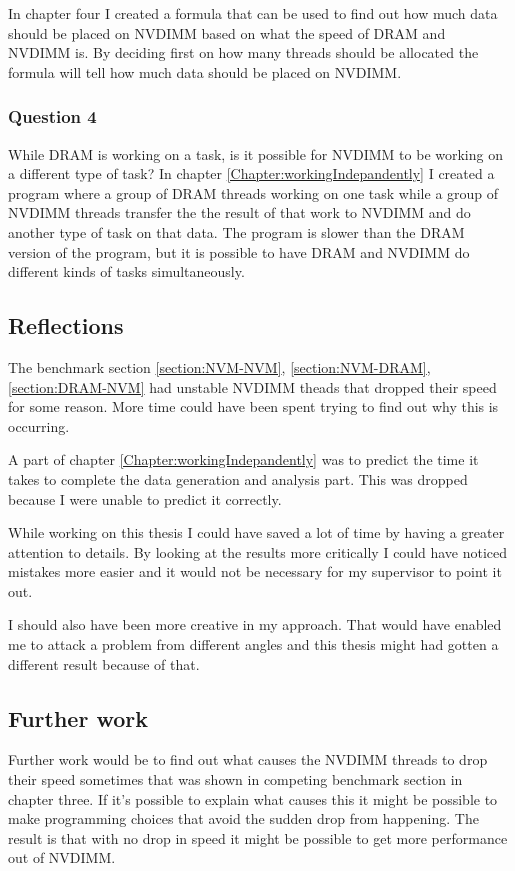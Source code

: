 \documentclass[12pt,a4paper,USenglish]{article}      %
\begin{document}
In chapter four I created a formula that can be used to find out how much data should be placed on NVDIMM based on what the speed of DRAM and NVDIMM is. By deciding first on how many threads should be allocated the formula will tell how much data should be placed on NVDIMM.

\subsubsection{Question 4}
While DRAM is working on a task, is it possible for NVDIMM to be working on a different type of task?
In chapter \ref{Chapter:workingIndepandently} I created a program where a group of DRAM threads working on one task while a group of NVDIMM threads transfer the the result of that work to NVDIMM and do another type of task on that data. The program is slower than the DRAM version of the program, but it is possible to have DRAM and NVDIMM do different kinds of tasks simultaneously.


\subsection{Reflections}
The benchmark section \ref{section:NVM-NVM}, \ref{section:NVM-DRAM}, \ref{section:DRAM-NVM} had unstable NVDIMM theads that dropped their speed for some reason. More time could have been spent trying to find out why this is occurring.

A part of chapter \ref{Chapter:workingIndepandently} was to predict the time it takes to complete the data generation and analysis part. This was dropped because I were unable to predict it correctly.

While working on this thesis I could have saved a lot of time by having a greater attention to details. By looking at the results more critically I could have noticed mistakes more easier and it would not be necessary for my supervisor to point it out. 

I should also have been more creative in my approach. That would have enabled me to attack a problem from different angles and this thesis might had gotten a different result because of that.

\subsection{Further work}
Further work would be to find out what causes the NVDIMM threads to drop their speed sometimes that was shown in competing benchmark section in chapter three.
If it's possible to explain what causes this it might be possible to make programming choices that avoid the sudden drop from happening. The result is that with no drop in speed it might be possible to get more performance out of NVDIMM.

\clearpage
\printbibliography
\end{document}
